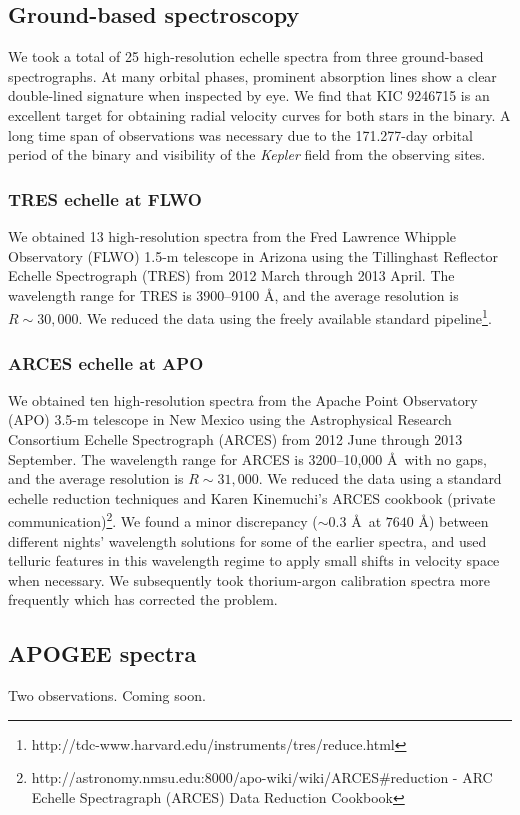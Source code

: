 \subsection{Ground-based spectroscopy}\label{spectra}
We took a total of 25 high-resolution echelle spectra from three ground-based spectrographs. At many orbital phases, prominent absorption lines show a clear double-lined signature when inspected by eye. We find that KIC 9246715 is an excellent target for obtaining radial velocity curves for both stars in the binary. A long time span of observations was necessary due to the 171.277-day orbital period of the binary and visibility of the \emph{Kepler} field from the observing sites.

\subsubsection{TRES echelle at FLWO}\label{tres}
We obtained 13 high-resolution spectra from the Fred Lawrence Whipple Observatory (FLWO) 1.5-m telescope in Arizona using the Tillinghast Reflector Echelle Spectrograph (TRES) from 2012 March through 2013 April. The wavelength range for TRES is 3900--9100 \AA, and the average resolution is $R \sim 30,000$. We reduced the data using the freely available standard pipeline\footnote{http://tdc-www.harvard.edu/instruments/tres/reduce.html}.

\subsubsection{ARCES echelle at APO}\label{arces}
We obtained ten high-resolution spectra from the Apache Point Observatory (APO) 3.5-m telescope in New Mexico using the Astrophysical Research Consortium Echelle Spectrograph (ARCES) from 2012 June through 2013 September. The wavelength range for ARCES is 3200--10,000 \AA \ with no gaps, and the average resolution is $R \sim 31,000$. We reduced the data using a standard echelle reduction techniques and Karen Kinemuchi's ARCES cookbook (private communication)\footnote{http://astronomy.nmsu.edu:8000/apo-wiki/wiki/ARCES#reduction - ARC Echelle Spectragraph (ARCES) Data Reduction Cookbook}. We found a minor discrepancy ($\sim 0.3$ \AA \ at $7640$ \AA) between different nights' wavelength solutions for some of the earlier spectra, and used telluric features in this wavelength regime to apply small shifts in velocity space when necessary. We subsequently took thorium-argon calibration spectra more frequently which has corrected the problem.

\subsection{APOGEE spectra}\label{apogee}
Two observations. Coming soon.
